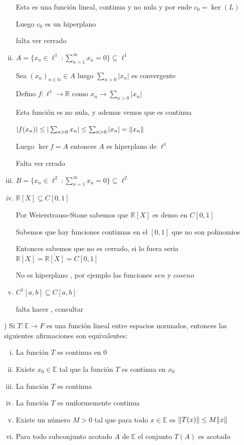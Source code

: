 \documentclass[12pt]{article}
\newcommand{\R}{\mathbb{R}}
\newcommand{\E}{\mathbb{E}}
\newcommand{\N}{\mathbb{N}}
\newcommand{\ra}{\rightarrow}
\newcommand{\ol}{\overline}
\DeclarePairedDelimiter{\norm}{\lVert}{\rVert}
\begin{document}
\begin{enumerate}[i.]
			Esta es una función lineal, continua y no nula y por ende $c_{0} = \ker (L)$ 

			Luego $c_{0}$ es un hiperplano 

			falta ver cerrado

		\item $A = \{x_{n} \in \ell^1\ : \sum_{n=1}^{\infty} x_{n} = 0\} \subseteq \ell^1$

			Sea $(x_{n})_{n \in \N }  \in A $ luego $\sum_{n > 0} |x_{n}| $ es convergente

			Defino $f: \ell^1 \ra \R$ como $x_{n} \ra \sum_{n>0} |x_{n}|$

			Esta función es no nula, y ademas vemos que es continua

			$|f(x_{n})| \leq |\sum_{n>0} x_{n}| \leq \sum_{n>0} |x_{n}| = \norm {x_{n}} $

			Luego $\ker f = A$ entonces $A$ es hiperplano de $\ell^1$
			
			Falta ver crrado

		\item $B = \{x_{n} \in \ell^2\ : \sum_{n=1}^{\infty} x_{n} = 0\} \subseteq \ell^2$



		\item $\R[X] \subseteq C[0,1]$

			Por Weierstrauss-Stone sabemos que $\R [X]$ es denso en $C[0,1]$
			
			Sabemos que hay funciones continuas en el $[0,1]$ que no son polinomios

			Entonces sabemos que no es cerrado, si lo fuera seria $\R[X] = \ol{\R[X]} = C[0,1]$

			No es hiperplano , por ejemplo las funciones $sen$ y $coseno$

		\item $C^1[a,b] \subseteq C[a,b] $

		falta hacer , consultar
	\end{enumerate}

) Si $T: \E \ra F $ es una función lineal entre espacios normados, entonces las siguientes afirmaciones son equivalentes:

	\begin{enumerate}[i.]
			
		\item La función $T$ es continua en 0	

		\item Existe $x_{0} \in \E$ tal que la función $T$ es continua en $x_{0}$

		\item La función $T$ es continua

		\item La función $T$ es uniformemente continua

		\item Existe un número $M>0$ tal que para todo $x \in \E$ es $\norm{T(x)} \leq M\norm{x} $

		\item Para todo subconjunto acotado $A$ de $ \E$ el conjunto $T(A)$ es acotado
	\end{enumerate}
\end{document}

